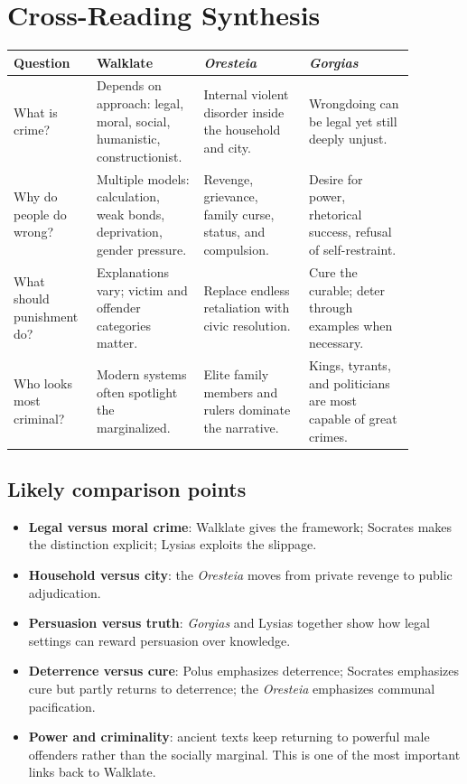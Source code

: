 \documentclass[11pt]{article}
\begin{document}
\section{Cross-Reading Synthesis}

\begin{tabular}{@{}p{0.16\linewidth}p{0.24\linewidth}p{0.24\linewidth}p{0.24\linewidth}@{}}
\toprule
\textbf{Question} & \textbf{Walklate} & \textbf{\textit{Oresteia}} & \textbf{\textit{Gorgias}} \\
\midrule
What is crime? & Depends on approach: legal, moral, social, humanistic, constructionist. & Internal violent disorder inside the household and city. & Wrongdoing can be legal yet still deeply unjust. \\
Why do people do wrong? & Multiple models: calculation, weak bonds, deprivation, gender pressure. & Revenge, grievance, family curse, status, and compulsion. & Desire for power, rhetorical success, refusal of self-restraint. \\
What should punishment do? & Explanations vary; victim and offender categories matter. & Replace endless retaliation with civic resolution. & Cure the curable; deter through examples when necessary. \\
Who looks most criminal? & Modern systems often spotlight the marginalized. & Elite family members and rulers dominate the narrative. & Kings, tyrants, and politicians are most capable of great crimes. \\
\bottomrule
\end{tabular}

\subsection*{Likely comparison points}
\begin{itemize}
\item \textbf{Legal versus moral crime}: Walklate gives the framework; Socrates makes the distinction explicit; Lysias exploits the slippage.
\item \textbf{Household versus city}: the \textit{Oresteia} moves from private revenge to public adjudication.
\item \textbf{Persuasion versus truth}: \textit{Gorgias} and Lysias together show how legal settings can reward persuasion over knowledge.
\item \textbf{Deterrence versus cure}: Polus emphasizes deterrence; Socrates emphasizes cure but partly returns to deterrence; the \textit{Oresteia} emphasizes communal pacification.
\item \textbf{Power and criminality}: ancient texts keep returning to powerful male offenders rather than the socially marginal. This is one of the most important links back to Walklate.
\end{itemize}
\end{document}
